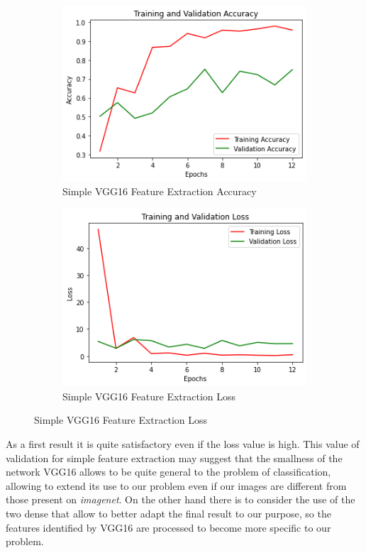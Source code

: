 \begin{figure}[H]
	\begin{subfigure}{0.5\textwidth}
		\includegraphics[width=0.9\linewidth]{img/vgg16/vgg16fe1acc.png} 
		\caption{Simple VGG16 Feature Extraction Accuracy}
		\label{fig:vgg16fe1acc}
	\end{subfigure}
	\begin{subfigure}{0.5\textwidth}
		\includegraphics[width=0.9\linewidth]{img/vgg16/vgg16fe1loss.png}
		\caption{Simple VGG16 Feature Extraction Loss}
		\label{fig:vgg16fe1loss}
	\end{subfigure}
\end{figure}

As a first result it is quite satisfactory even if the loss value is high. This value of validation for simple feature extraction may suggest that the smallness of the network VGG16 allows to be quite general to the problem of classification, allowing to extend its use to our problem even if our images are different from those present on \textit{imagenet}. On the other hand there is to consider the use of the two dense that allow to better adapt the final result to our purpose, so the features identified by VGG16 are processed to become more specific to our problem.


